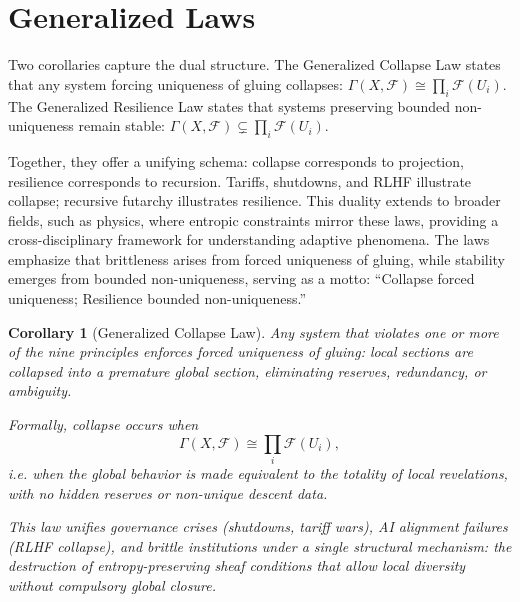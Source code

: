 \documentclass{article}
\newcommand{\lra}{\Leftrightarrow}
\newtheorem{corollary}{Corollary}
\newcommand{\lra}{\Leftrightarrow}
\begin{document}
\section{Generalized Laws}

Two corollaries capture the dual structure. The Generalized Collapse Law states that any system forcing uniqueness of gluing collapses: $\Gamma(X,\mathcal{F}) \cong \prod_i \mathcal{F}(U_i)$. The Generalized Resilience Law states that systems preserving bounded non-uniqueness remain stable: $\Gamma(X,\mathcal{F}) \subsetneq \prod_i \mathcal{F}(U_i)$.

Together, they offer a unifying schema: collapse corresponds to projection, resilience corresponds to recursion. Tariffs, shutdowns, and RLHF illustrate collapse; recursive futarchy illustrates resilience. This duality extends to broader fields, such as physics, where entropic constraints mirror these laws, providing a cross-disciplinary framework for understanding adaptive phenomena. The laws emphasize that brittleness arises from forced uniqueness of gluing, while stability emerges from bounded non-uniqueness, serving as a motto: “Collapse \lra forced uniqueness; Resilience \lra bounded non-uniqueness.”

\begin{corollary}[Generalized Collapse Law]
Any system that violates one or more of the nine principles enforces 
\emph{forced uniqueness of gluing}: local sections are collapsed into a 
premature global section, eliminating reserves, redundancy, or ambiguity.  

Formally, collapse occurs when
\[
\Gamma(X,\mathcal{F}) \cong \prod_{i} \mathcal{F}(U_i),
\]
i.e. when the global behavior is made equivalent to the totality of local 
revelations, with no hidden reserves or non-unique descent data.  

This law unifies governance crises (shutdowns, tariff wars), AI alignment 
failures (RLHF collapse), and brittle institutions under a single structural 
mechanism: the destruction of entropy-preserving sheaf conditions that allow 
local diversity without compulsory global closure.
\end{corollary}
\end{document}
